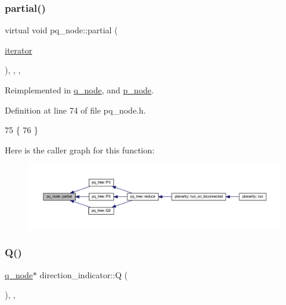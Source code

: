 \subsubsection{\texorpdfstring{partial()}{partial()}}
{\footnotesize\ttfamily virtual void pq\+\_\+node\+::partial (\begin{DoxyParamCaption}\item[{\mbox{\hyperlink{classpq__node_a34898c9eb1527787c07e8ebefd6bfba5}{iterator}}}]{ }\end{DoxyParamCaption})\hspace{0.3cm}{\ttfamily [inline]}, {\ttfamily [protected]}, {\ttfamily [virtual]}, {\ttfamily [inherited]}}



Reimplemented in \mbox{\hyperlink{classq__node_a4d17efa229bcea76ffebc92c2e4da3a3}{q\+\_\+node}}, and \mbox{\hyperlink{classp__node_a217e83b61144fe6b64e3fbade0aecfcf}{p\+\_\+node}}.



Definition at line 74 of file pq\+\_\+node.\+h.


\begin{DoxyCode}
75     \{
76     \}
\end{DoxyCode}
Here is the caller graph for this function\+:
\nopagebreak
\begin{figure}[H]
\begin{center}
\leavevmode
\includegraphics[width=350pt]{classpq__node_aa6830ab47a280f41fe61b7d2f8b508bb_icgraph}
\end{center}
\end{figure}
\mbox{\label{classdirection__indicator_ace3187cd86da88e949045c6a57ea6a00}} 
\subsubsection{\texorpdfstring{Q()}{Q()}}
{\footnotesize\ttfamily \mbox{\hyperlink{classq__node}{q\+\_\+node}}$\ast$ direction\+\_\+indicator\+::Q (\begin{DoxyParamCaption}{ }\end{DoxyParamCaption})\hspace{0.3cm}{\ttfamily [inline]}, {\ttfamily [private]}, {\ttfamily [virtual]}}



